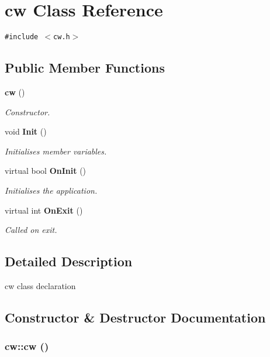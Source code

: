 \section{cw Class Reference}
\label{classcw}
{\tt \#include $<$cw.h$>$}

\subsection*{Public Member Functions}
\begin{CompactItemize}
\item 
{\bf cw} ()
\begin{CompactList}\small\item\em Constructor. \item\end{CompactList}\item 
void {\bf Init} ()
\begin{CompactList}\small\item\em Initialises member variables. \item\end{CompactList}\item 
virtual bool {\bf On\-Init} ()
\begin{CompactList}\small\item\em Initialises the application. \item\end{CompactList}\item 
virtual int {\bf On\-Exit} ()
\begin{CompactList}\small\item\em Called on exit. \item\end{CompactList}\end{CompactItemize}


\subsection{Detailed Description}
cw class declaration 



\subsection{Constructor \& Destructor Documentation}
\subsubsection{\setlength{\rightskip}{0pt plus 5cm}cw::cw ()}\label{classcw_53c15b5bc58b21a3135edc55074d393c}


